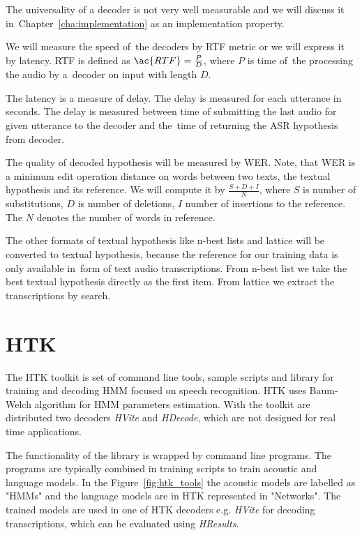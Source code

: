 {The universality of a decoder is not very well measurable and we will discuss it 
in~Chapter~\ref{cha:implementation} as an implementation property.

We will measure the speed of~the decoders by \acl{RTF} metric or we will express it by latency.
\ac{RTF} is defined as $\ac{RTF} = \frac{P}{D}$, where $P$ is time of~the processing the audio by a~decoder on input with length $D$. 

The latency is a measure of delay. The delay is measured for each utterance in seconds. 
The delay is measured between time of submitting the last audio for given utterance to the decoder and 
the~time of returning the \ac{ASR} hypothesis from decoder.

The quality of decoded hypothesis will be measured by \ac{WER}.
Note, that \ac{WER} is a minimum edit operation distance on words between two texts, the textual hypothesis
and its reference.
We will compute it by $\frac{S+D+I}{N}$, where $S$ is number of substitutions,
$D$ is number of deletions, $I$ number of insertions to the reference. 
The $N$ denotes the number of words in reference.

The other formats of textual hypothesis like n-best lists and lattice
will be converted to textual hypothesis, because the reference for our training data is only available  
in~form of text audio transcriptions.
From n-best list we take the best textual hypothesis directly as the first item. From lattice
we extract the transcriptions by search.  



\section{\ac{HTK}}
\label{sec:back_htk}
The \ac{HTK} toolkit is set of command line tools, sample scripts and library
for training and decoding \ac{HMM} focused on speech recognition.
\ac{HTK} uses Baum-Welch algorithm for \ac{HMM} parameters estimation.
With the toolkit are distributed two decoders {\it HVite} and {\it HDecode},
which are not designed for real time applications.

The functionality of the library is wrapped by command line programs.
The programs are typically combined in training scripts to train acoustic and language models.
In the Figure~\ref{fig:htk_tools} the acoustic models are labelled as "HMMs" 
and the language models are in \ac{HTK} represented in "Networks".
The trained models are used in one of \ac{HTK} decoders e.g. {\it HVite}\/ for decoding
transcriptions, which can be evaluated using {\it HResults}.

}
